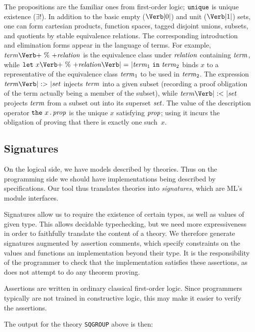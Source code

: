 The propositions are the familiar ones from first-order logic;
$\mbox{\texttt{unique}}$ is unique existence ($\exists!$). In addition to the basic
empty ($\ZERO$) and unit ($\ONE$) sets, one can form cartesian
products, function spaces, tagged disjoint unions, subsets, and
quotients by stable equivalence relations. The corresponding
introduction and elimination forms appear in the language of terms.
For example, $\Term \PERCENT \metav{relation}$ is the equivalence
class under $\mbox{\textit{relation}}$ containing $\mbox{\textit{term}}$, while $\LET\ x
\PERCENT \metav{relation} \mbox{\Verb| = |} \Term_1\ \IN\ \Term_2$
binds $x$ to a representative of the equivalence class $\mbox{\textit{term}}_1$ to be
used in $\mbox{\textit{term}}_2$. The expression $\Term \SUBIN \Set$ injects $\mbox{\textit{term}}$
into a given subset (recording a proof obligation of the term actually
being a member of the subset), while $\Term \SUBOUT \Set$ projects
$\mbox{\textit{term}}$ from a subset out into its superset $\mbox{\textit{set}}$. The value of the
description operator $\mbox{\texttt{the}}\ x \,.\, \mbox{\textit{prop}}$ is the unique $x$
satisfying $\mbox{\textit{prop}}$; using it incurs the obligation of proving that
there is exactly one such~$x$.


\subsection{Signatures}
\label{sec:signatures}

On the logical side, we have models described by theories.  Thus on
the programming side we should have implementations being described by
specifications.  Our tool thus translates theories into
\emph{signatures}, which are ML's module interfaces.

Signatures allow us to require the existence of certain types, as well
as values of given type.  This allows decidable typechecking, but we
need more expressiveness in order to faithfully translate the content
of a theory.  We therefore generate signatures augmented by assertion
comments, which specify constraints on the values and functions an
implementation beyond their type.  It is the responsibility of the
programmer to check that the implementation satisfies these
assertions, as \RZ does not attempt to do any theorem proving.

Assertions are written in ordinary classical first-order logic. Since
programmers typically are not trained in constructive logic, this may
make it easier to verify the assertions.

The output for the theory \Verb|SQGROUP| above is then:
{\small {}}

